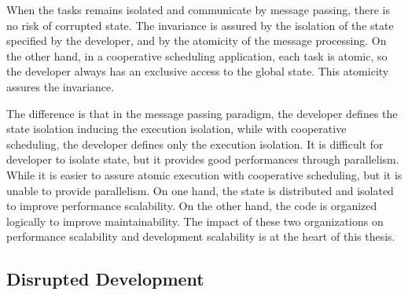 When the tasks remains isolated and communicate by message passing, there is no risk of corrupted state.
The invariance is assured by the isolation of the state specified by the developer, and by the atomicity of the message processing.
On the other hand, in a cooperative scheduling application, each task is atomic, so the developer always has an exclusive access to the global state.
This atomicity assures the invariance.


The difference is that in the message passing paradigm, the developer defines the state isolation inducing the execution isolation, while with cooperative scheduling, the developer defines only the execution isolation.
It is difficult for developer to isolate state, but it provides good performances through parallelism.
While it is easier to assure atomic execution with cooperative scheduling, but it is unable to provide parallelism.
On one hand, the state is distributed and isolated to improve performance scalability.
On the other hand, the code is organized logically to improve maintainability.
The impact of these two organizations on performance scalability and development scalability is at the heart of this thesis.

\subsection{Disrupted Development}


